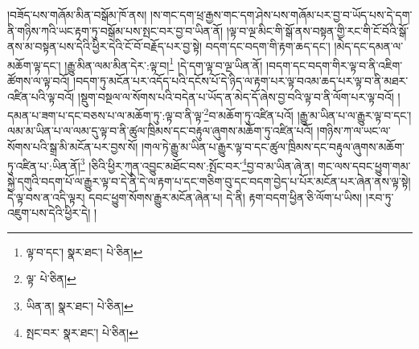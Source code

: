 །བཟོད་པས་གཞོམ་མིན་བསྒོམ་ཁོ་ནས། །ས་གང་དག་ཕྲ་རྒྱས་གང་དག་ཤེས་པས་གཞོམ་པར་བྱ་བ་ཡོད་པས་དེ་དག་ནི་གཉིས་ཀའི་ཡང་རྟག་ཏུ་བསྒོམ་པས་སྤང་བར་བྱ་བ་ཡིན་ནོ། །ལྟ་བ་ལྔ་མིང་གི་སྒོ་ནས་བསྟན་གྱི་རང་གི་ངོ་བོའི་སྒོ་ནས་མ་བསྟན་པས་དེའི་ཕྱིར་དེའི་ངོ་བོ་བརྗོད་པར་བྱ་སྟེ། བདག་དང་བདག་གི་རྟག་ཆད་དང་། །མེད་དང་དམན་ལ་མཆོག་ལྟ་དང་། །རྒྱུ་མིན་ལམ་མིན་དེར་:ལྟ་བ།\footnote{ལྟ་བ་དང་།  སྣར་ཐང་།  པེ་ཅིན། } །དེ་དག་ལྟ་བ་ལྔ་ཡིན་ནོ། །བདག་དང་བདག་གིར་ལྟ་བ་ནི་འཇིག་ཚོགས་ལ་ལྟ་བའོ། །བདག་ཏུ་མངོན་པར་འདོད་པའི་དངོས་པོ་དེ་ཉིད་ལ་རྟག་པར་ལྟ་བའམ་ཆད་པར་ལྟ་བ་ནི་མཐར་འཛིན་པའི་ལྟ་བའོ། །སྡུག་བསྔལ་ལ་སོགས་པའི་བདེན་པ་ཡོད་ན་མེད་དོ་ཞེས་བྱ་བའི་ལྟ་བ་ནི་ལོག་པར་ལྟ་བའོ། །དམན་པ་ཟག་པ་དང་བཅས་པ་ལ་མཆོག་ཏུ་:ལྟ་བ་ནི་ལྟ་\footnote{ལྟ་  པེ་ཅིན། }བ་མཆོག་ཏུ་འཛིན་པའོ། །རྒྱུ་མ་ཡིན་པ་ལ་རྒྱུར་ལྟ་བ་དང་། ལམ་མ་ཡིན་པ་ལ་ལམ་དུ་ལྟ་བ་ནི་ཚུལ་ཁྲིམས་དང་བརྟུལ་ཞུགས་མཆོག་ཏུ་འཛིན་པའོ། །གཉིས་ཀ་ལ་ཡང་ལ་སོགས་པའི་སྒྲ་མི་མངོན་པར་བྱས་སོ། །གལ་ཏེ་རྒྱུ་མ་ཡིན་པ་རྒྱུར་ལྟ་བ་དང་ཚུལ་ཁྲིམས་དང་བརྟུལ་ཞུགས་མཆོག་ཏུ་འཛིན་པ་:ཡིན་ནོ།\footnote{ཡིན་ན།  སྣར་ཐང་།  པེ་ཅིན། } །ཅིའི་ཕྱིར་ཀུན་འབྱུང་མཐོང་བས་:སྤོང་བར་\footnote{སྤང་བར་  སྣར་ཐང་།  པེ་ཅིན། }བྱ་བ་མ་ཡིན་ཞེ་ན། གང་ལས་དབང་ཕྱུག་གམ་སྐྱེ་དགུའི་བདག་པོ་ལ་རྒྱུར་ལྟ་བ་དེ་ནི་དེ་ལ་རྟག་པ་དང་གཅིག་བུ་དང་བདག་བྱེད་པ་པོར་མངོན་པར་ཞེན་ནས་ལྟ་སྟེ། དེ་ལྟ་བས་ན་འདི་ལྟར། དབང་ཕྱུག་སོགས་རྒྱུར་མངོན་ཞེན་པ། དེ་ནི། རྟག་བདག་ཕྱིན་ཅི་ལོག་པ་ཡིས། །རབ་ཏུ་འཇུག་པས་དེའི་ཕྱིར་དེ། །
